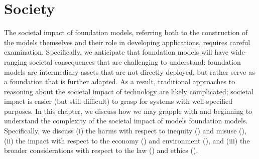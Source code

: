 \section{Society}
\label{sec:society}

The societal impact of foundation models, referring both to the construction of the models themselves and their role in developing applications, requires careful examination.
Specifically, we anticipate that foundation models will have wide-ranging societal consequences that are challenging to understand: foundation models are intermediary assets that are not directly deployed, but rather serve as a foundation that is further adapted.
As a result, traditional approaches to reasoning about the societal impact of technology are likely complicated; societal impact is easier (but still difficult) to grasp for systems with well-specified purposes.
In this chapter, we discuss how we may grapple with and beginning to understand the complexity of the societal impact of models foundation models.
Specifically, we discuss (i) the harms with respect to inequity () and misuse (), (ii) the impact with respect to the economy () and environment (), and (iii) the broader considerations with respect to the law () and ethics (). 








